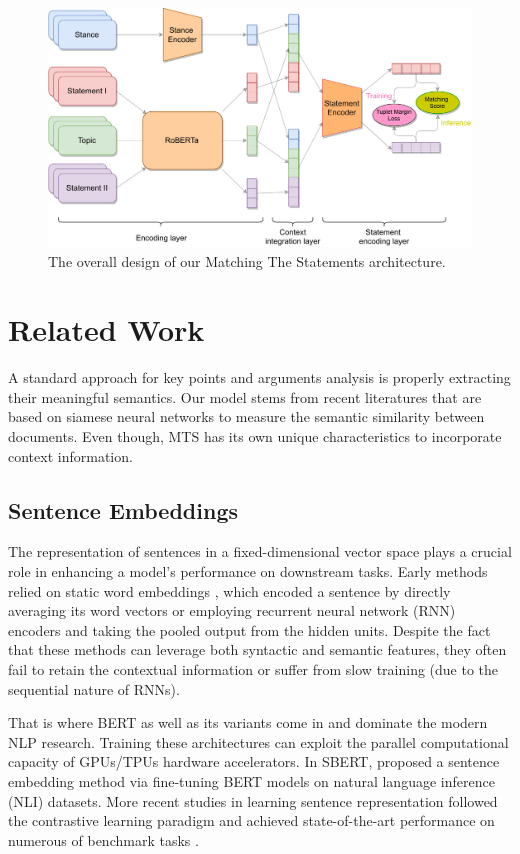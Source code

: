 \begin{figure}[ht!]
\centering
\includegraphics[scale=0.6]{figures/KPA-model.pdf}
\caption{The overall design of our Matching The Statements architecture.}
\label{fig:model}
\end{figure}

\section{Related Work}
\label{sec:related-work}
A standard approach for key points and arguments analysis is properly extracting their meaningful semantics. Our model stems from recent literatures that are based on siamese neural networks \citep{reimers-gurevych-2019-sentence, gao2021simcse} to measure the semantic similarity between documents. Even though, MTS has its own unique characteristics to incorporate context information.
\subsection{Sentence Embeddings} 
The representation of sentences in a fixed-dimensional vector space plays a crucial role in enhancing a model's performance on downstream tasks. Early methods relied on static word embeddings \citep{pennington-etal-2014-glove, bojanowski2017enriching}, which encoded a sentence by directly averaging its word vectors or employing recurrent neural network (RNN) encoders \citep{conneau-etal-2017-supervised} and taking the pooled output from the hidden units. Despite the fact that these methods can leverage both syntactic and semantic features, they often fail to retain the contextual information or suffer from slow training (due to the sequential nature of RNNs). 

That is where BERT \cite{devlin2018bert} as well as its variants come in and dominate the modern NLP research. Training these architectures can exploit the parallel computational capacity of GPUs/TPUs hardware accelerators. In SBERT, \citet{reimers-gurevych-2019-sentence} proposed a sentence embedding method via fine-tuning BERT models on natural language inference (NLI) datasets. More recent studies in learning sentence representation followed the contrastive learning paradigm and achieved state-of-the-art performance on numerous of benchmark tasks \citep{liao2021sentence, yan2021consert}.

